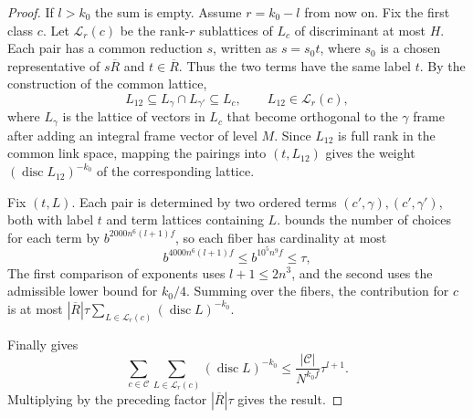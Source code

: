 \begin{proof}
If $l>k_0$ the sum is empty. Assume $r=k_0-l$ from now on.
Fix the first class $c$. Let $\mathcal L_r(c)$ be the rank-$r$ sublattices of $L_c$ of discriminant at most $H$.
Each pair has a common reduction $s$, written as $s=s_0t$,
where $s_0$ is a chosen representative of $s\overline R$ and $t\in\overline R$.
Thus the two terms have the same label $t$. By the construction of the common lattice,
\[
 L_{12}\subseteq L_\gamma\cap L_{\gamma'}\subseteq L_c,
 \qquad L_{12}\in\mathcal L_r(c),
\]
where $L_\gamma$ is the lattice of vectors in $L_c$ that become orthogonal to the $\gamma$ frame after adding an integral frame vector of level $M$.
Since $L_{12}$ is full rank in the common link space, mapping the pairings into $(t,L_{12})$
gives the weight $(\operatorname{disc}L_{12})^{-k_0}$ of the corresponding lattice.

Fix $(t,L)$. Each pair is determined by two ordered terms $(c',\gamma),(c',\gamma')$,
both with label $t$ and term lattices containing $L$.
 bounds the number of choices for each term by
$b^{2000n^6(l+1)f}$, so each fiber has cardinality at most
\[
 b^{4000n^6(l+1)f}\le b^{10^5n^9f}\le \tau,
\]
The first comparison of exponents uses $l+1\le2n^3$, and the second uses the admissible lower bound for $k_0/4$.
Summing over the fibers, the contribution for $c$ is at most
$|\overline R|\tau\sum_{L\in\mathcal L_r(c)}(\operatorname{disc}L)^{-k_0}$.

Finally  gives
\[
 \sum_{c\in\mathcal C}\sum_{L\in\mathcal L_r(c)}
     (\operatorname{disc}L)^{-k_0}
 \le \frac{|\mathcal C|}{N^{k_0 f}}\tau^{l+1}.
\]
Multiplying by the preceding factor $|\overline R|\tau$ gives the result.
\end{proof}

